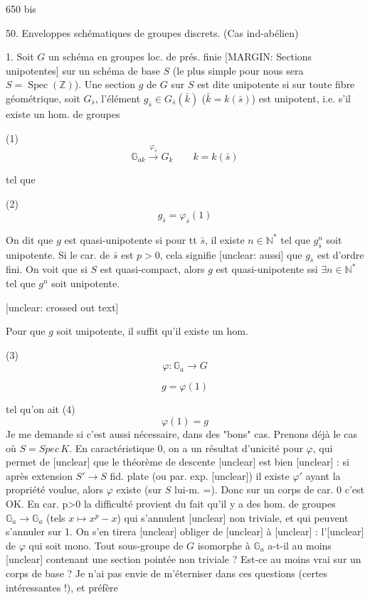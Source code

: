 \newpage


650 bis

50. Enveloppes schématiques de groupes discrets.
(Cas ind-abélien)

1. Soit $G$ un schéma en groupes loc. de prés. finie
[MARGIN: Sections unipotentes]
sur un schéma de base $S$ (le plus simple pour nous sera $S = \operatorname{Spec}(\mathbb{Z})$). Une section $g$ de $G$ sur $S$ est dite unipotente si sur toute fibre géométrique, soit $G_{\bar{s}}$, l'élément $g_{\bar{s}} \in G_{\bar{s}}(\bar{k})$ ($\bar{k} = k(\bar{s})$) est unipotent, i.e. s'il existe un hom. de groupes

(1) $$ \mathbb{G}_{a k} \xrightarrow{\varphi_{\bar{s}}} G_k \qquad k = k(\bar{s}) $$

tel que

(2) $$ g_{\bar{s}} = \varphi_{\bar{s}}(1) $$

On dit que $g$ est quasi-unipotente si pour tt $\bar{s}$, il existe $n \in \mathbb{N}^*$ tel que $g_{\bar{s}}^n$ soit unipotente. Si le car. de $\bar{s}$ est $p > 0$, cela signifie [unclear: aussi] que $g_{\bar{s}}$ est d'ordre fini. On voit que si $S$ est quasi-compact, alors $g$ est quasi-unipotente ssi $\exists n \in \mathbb{N}^*$ tel que $g^n$ soit unipotente.

[unclear: crossed out text]

Pour que $g$ soit unipotente, il suffit qu'il existe un hom.

(3) $$ \varphi : \mathbb{G}_a \longrightarrow G $$

$$ g = \varphi(1) $$

\newpage


tel qu'on ait
(4) $$ \varphi(1) = g $$
Je me demande si c'est aussi nécessaire,
dans des "bons" cas. Prenons déjà le
cas où $S = Spec \, K$. En caractéristique $0$,
on a un résultat d'unicité pour $\varphi$,
qui permet de [unclear] que le théorème de
descente [unclear] est bien [unclear] :
si après extension $S' \to S$ fid. plate (ou par. exp. [unclear])
il existe $\varphi'$ ayant la propriété voulue,
alors $\varphi$ existe (sur $S$ lui-m. =). Donc sur
un corps de car. 0 c'est OK. En car. p>0
la difficulté provient du fait qu'il y a
des hom. de groupes $\mathbb{G}_a \to \mathbb{G}_a$ (tels $x \mapsto x^p - x$)
qui s'annulent [unclear] non triviale, et qui peuvent
s'annuler sur 1. On s'en tirera [unclear]
obliger de [unclear] à [unclear] : l'[unclear] de $\varphi$ qui
soit mono. Tout sous-groupe de $G$
isomorphe à $\mathbb{G}_a$ a-t-il au moins [unclear]
contenant une section pointée non triviale ?
Est-ce au moins vrai sur un corps de
base ?
Je n'ai pas envie de m'éterniser dans
ces questions (certes intéressantes !), et préfère

